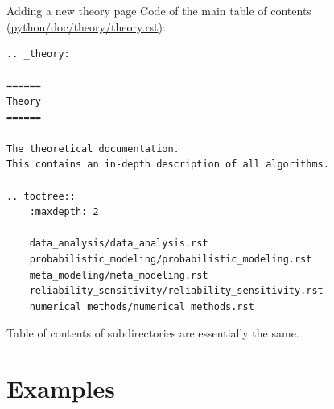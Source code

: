 \documentclass[8pt, handout]{beamer}
\begin{document}
\begin{frame}[fragile]{Adding a new theory page}
Code of the main table of contents (\href{https://github.com/openturns/openturns/blob/master/python/doc/theory/theory.rst}{python/doc/theory/theory.rst}):

\begin{lstlisting}
.. _theory:

======
Theory
======

The theoretical documentation.
This contains an in-depth description of all algorithms.

.. toctree::
    :maxdepth: 2

    data_analysis/data_analysis.rst
    probabilistic_modeling/probabilistic_modeling.rst
    meta_modeling/meta_modeling.rst
    reliability_sensitivity/reliability_sensitivity.rst
    numerical_methods/numerical_methods.rst
\end{lstlisting}
Table of contents of subdirectories are essentially the same.
\end{frame}



\section{Examples}

\end{document}
